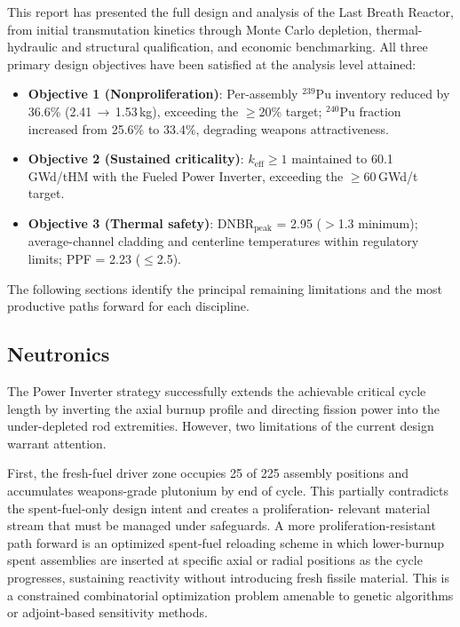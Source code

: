 
This report has presented the full design and analysis of the Last Breath
Reactor, from initial transmutation kinetics through Monte Carlo depletion,
thermal-hydraulic and structural qualification, and economic benchmarking.
All three primary design objectives have been satisfied at the analysis
level attained:

\begin{itemize}
    \item \textbf{Objective 1 (Nonproliferation)}: Per-assembly $^{239}$Pu
    inventory reduced by 36.6\% (2.41\,$\to$\,1.53\,kg), exceeding the
    $\geq$20\% target; $^{240}$Pu fraction increased from 25.6\% to 33.4\%,
    degrading weapons attractiveness.
    \item \textbf{Objective 2 (Sustained criticality)}: $k_\text{eff} \geq 1$
    maintained to 60.1\,GWd/tHM with the Fueled Power Inverter, exceeding
    the $\geq$60\,GWd/t target.
    \item \textbf{Objective 3 (Thermal safety)}: DNBR$_\text{peak}$ = 2.95
    ($>$1.3 minimum); average-channel cladding and centerline temperatures
    within regulatory limits; PPF = 2.23 ($\leq$2.5).
\end{itemize}

The following sections identify the principal remaining limitations and the
most productive paths forward for each discipline.

\subsection{Neutronics}

The Power Inverter strategy successfully extends the achievable critical cycle
length by inverting the axial burnup profile and directing fission power into
the under-depleted rod extremities. However, two limitations of the current
design warrant attention.

First, the fresh-fuel driver zone occupies 25 of 225 assembly positions and
accumulates weapons-grade plutonium by end of cycle. This partially
contradicts the spent-fuel-only design intent and creates a proliferation-
relevant material stream that must be managed under safeguards. A more
proliferation-resistant path forward is an optimized spent-fuel reloading
scheme in which lower-burnup spent assemblies are inserted at specific axial
or radial positions as the cycle progresses, sustaining reactivity without
introducing fresh fissile material. This is a constrained combinatorial
optimization problem amenable to genetic algorithms or adjoint-based
sensitivity methods.

